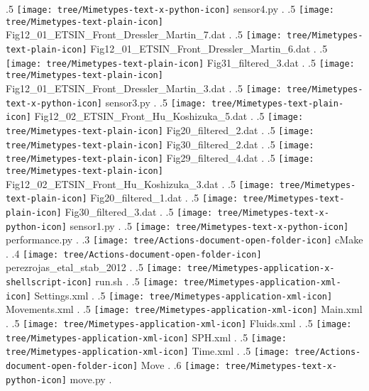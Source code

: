 {.5 { \texttt{[image: tree/Mimetypes-text-x-python-icon]} sensor4.py }.
.5 { \texttt{[image: tree/Mimetypes-text-plain-icon]} Fig12\_01\_ETSIN\_Front\_Dressler\_Martin\_7.dat }.
.5 { \texttt{[image: tree/Mimetypes-text-plain-icon]} Fig12\_01\_ETSIN\_Front\_Dressler\_Martin\_6.dat }.
.5 { \texttt{[image: tree/Mimetypes-text-plain-icon]} Fig31\_filtered\_3.dat }.
.5 { \texttt{[image: tree/Mimetypes-text-plain-icon]} Fig12\_01\_ETSIN\_Front\_Dressler\_Martin\_3.dat }.
.5 { \texttt{[image: tree/Mimetypes-text-x-python-icon]} sensor3.py }.
.5 { \texttt{[image: tree/Mimetypes-text-plain-icon]} Fig12\_02\_ETSIN\_Front\_Hu\_Koshizuka\_5.dat }.
.5 { \texttt{[image: tree/Mimetypes-text-plain-icon]} Fig20\_filtered\_2.dat }.
.5 { \texttt{[image: tree/Mimetypes-text-plain-icon]} Fig30\_filtered\_2.dat }.
.5 { \texttt{[image: tree/Mimetypes-text-plain-icon]} Fig29\_filtered\_4.dat }.
.5 { \texttt{[image: tree/Mimetypes-text-plain-icon]} Fig12\_02\_ETSIN\_Front\_Hu\_Koshizuka\_3.dat }.
.5 { \texttt{[image: tree/Mimetypes-text-plain-icon]} Fig20\_filtered\_1.dat }.
.5 { \texttt{[image: tree/Mimetypes-text-plain-icon]} Fig30\_filtered\_3.dat }.
.5 { \texttt{[image: tree/Mimetypes-text-x-python-icon]} sensor1.py }.
.5 { \texttt{[image: tree/Mimetypes-text-x-python-icon]} performance.py }.
.3 { \texttt{[image: tree/Actions-document-open-folder-icon]} cMake }.
.4 { \texttt{[image: tree/Actions-document-open-folder-icon]} perezrojas\_etal\_stab\_2012 }.
.5 { \texttt{[image: tree/Mimetypes-application-x-shellscript-icon]} run.sh }.
.5 { \texttt{[image: tree/Mimetypes-application-xml-icon]} Settings.xml }.
.5 { \texttt{[image: tree/Mimetypes-application-xml-icon]} Movements.xml }.
.5 { \texttt{[image: tree/Mimetypes-application-xml-icon]} Main.xml }.
.5 { \texttt{[image: tree/Mimetypes-application-xml-icon]} Fluids.xml }.
.5 { \texttt{[image: tree/Mimetypes-application-xml-icon]} SPH.xml }.
.5 { \texttt{[image: tree/Mimetypes-application-xml-icon]} Time.xml }.
.5 { \texttt{[image: tree/Actions-document-open-folder-icon]} Move }.
.6 { \texttt{[image: tree/Mimetypes-text-x-python-icon]} move.py }.
}
